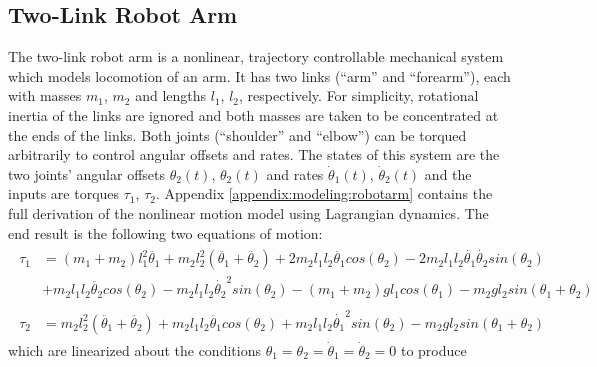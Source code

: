 \subsection{Two-Link Robot Arm}
The two-link robot arm is a nonlinear, trajectory controllable mechanical system which models locomotion of an arm.  It has two links (``arm'' and ``forearm''), each with masses $m_{1}$, $m_{2}$ and lengths $l_{1}$, $l_{2}$, respectively.  For simplicity, rotational inertia of the links are ignored and both masses are taken to be concentrated at the ends of the links.  Both joints (``shoulder'' and ``elbow'') can be torqued arbitrarily to control angular offsets and rates.  The states of this system are the two joints' angular offsets $\theta_{2}(t)$, $\theta_{2}(t)$ and rates $\dot{\theta}_{1}(t)$, $\dot{\theta}_{2}(t)$ and the inputs are torques $\tau_{1}$, $\tau_{2}$.  Appendix \ref{appendix:modeling:robotarm} contains the full derivation of the nonlinear motion model using Lagrangian dynamics.  The end result is the following two equations of motion:
\begin{subequations}
\begin{align}
\begin{split}
	\tau_{1} &= (m_{1} + m_{2})l_{1}^{2}\ddot{\theta_{1}} +
	m_{2}l_{2}^{2}(\ddot{\theta_{1}} + \ddot{\theta_{2}})
	+ 2m_{2}l_{1}l_{2}\ddot{\theta_{1}}cos(\theta_{2})
	- 2m_{2}l_{1}l_{2}\dot{\theta_{1}}\dot{\theta_{2}}sin(\theta_{2})\\
	&+ m_{2}l_{1}l_{2}\ddot{\theta_{2}}cos(\theta_{2})
	- m_{2}l_{1}l_{2}\dot{\theta_{2}}^{2}sin(\theta_{2})
	- (m_{1} + m_{2})gl_{1}cos(\theta_{1}) - m_{2}gl_{2}sin(\theta_{1} + \theta_{2})
\end{split}
	\\
\begin{split}
	\tau_{2} &= m_{2}l_{2}^{2}(\ddot{\theta_{1}} + \ddot{\theta_{2}})
	+ m_{2}l_{1}l_{2}\ddot{\theta_{1}}cos(\theta_{2})
	+ m_{2}l_{1}l_{2}\dot{\theta_{1}}^{2}sin(\theta_{2})
	- m_{2}gl_{2}sin(\theta_{1} + \theta_{2})
\end{split}
\end{align}
\end{subequations}
which are linearized about the conditions $\theta_{1} = \theta_{2} = \dot{\theta}_{1} = \dot{\theta}_{2} = 0$ to produce
